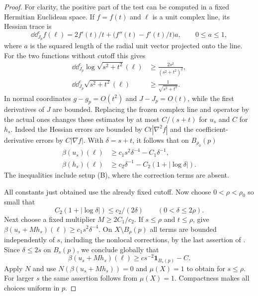 \begin{proof}
For clarity, the positive part of the test can be computed in a fixed
Hermitian Euclidean space.  If $f=f(t)$ and $\ell$ is a unit complex
line, its Hessian trace is
\[
 \dd\dd_{J_p}^cf(\ell)
 =2f'(t)/t+\bigl(f''(t)-f'(t)/t\bigr)a,
 \qquad 0\le a\le1,
\]
where $a$ is the squared length of the radial unit vector projected onto
the line.  For the two functions without cutoff this gives
\begin{align}
 \dd\dd_{J_p}^c\log\sqrt{s^2+t^2}(\ell)
   &\ge \frac{2s^2}{(s^2+t^2)^2},\label{eq:current-log-trace}\\
 \dd\dd_{J_p}^c\sqrt{s^2+t^2}(\ell)
   &\ge \frac1{\sqrt{s^2+t^2}}.\label{eq:current-root-trace}
\end{align}
In normal coordinates $g-g_p=O(t^2)$ and $J-J_p=O(t)$, while the first
derivatives of $J$ are bounded.  Replacing the frozen complex line and
operator by the actual ones changes these estimates by at most
$C/(s+t)$ for $u_s$ and $C$ for $h_s$.  Indeed the Hessian errors are
bounded by $Ct|\nabla^2f|$ and the coefficient-derivative errors by
$C|\nabla f|$.  With $\delta=s+t$, it follows that on
$B_{\rho_0}(p)$
\begin{align}
 \beta(u_s)(\ell)&\ge c_1s^2\delta^{-4}-C_1\delta^{-1},
                  \label{eq:current-log-corrected}\\
 \beta(h_s)(\ell)&\ge c_2\delta^{-1}
                   -C_2(1+|\log\delta|).
                  \label{eq:current-root-corrected}
\end{align}
The inequalities include setup \textup{(B)}, where the correction terms
are absent.

All constants just obtained use the already fixed cutoff.  Now choose
$0<\rho<\rho_0$ so small that
\[
 C_2(1+|\log\delta|)\le c_2/(2\delta)
                  \qquad(0<\delta\le2\rho).
\]
Next choose a fixed multiplier $M\ge2C_1/c_2$.  If $s\le\rho$ and
$t\le\rho$, 
give $\beta(u_s+Mh_s)(\ell)\ge c_1s^2\delta^{-4}$.
On $X\setminus B_\rho(p)$ all terms are bounded independently of $s$,
including the nonlocal corrections, by the last assertion of
.  Since $\delta\le2s$ on $B_s(p)$,
we conclude globally that
\[
 \beta(u_s+Mh_s)(\ell)\ge c s^{-2}\mathbf1_{B_s(p)}-C.
\]
Apply $N$ and use $N(\beta(u_s+Mh_s))=0$ and $\mu(X)=1$ to obtain
 for $s\le\rho$.  For larger $s$ the
same assertion follows from $\mu(X)=1$.  Compactness makes all choices
uniform in $p$.
\end{proof}

